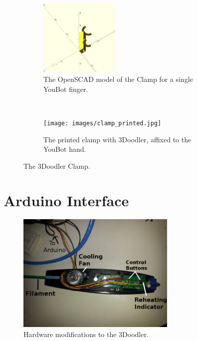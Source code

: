 \documentclass[conference]{acmsiggraph}
\begin{document}
\begin{figure}[t!]
\centering

\begin{subfigure}[t]{1.5in}
\centering
\includegraphics[width=1.5in]{images/clamp.png}
\caption{The OpenSCAD model of the Clamp for a single YouBot finger.}
\label{fig:halfclamp}
\end{subfigure}
~
\begin{subfigure}[t]{1.5in}
\centering
\texttt{[image: images/clamp\_printed.jpg]}
\caption{The printed clamp with 3Doodler, affixed to the YouBot hand.}
\label{fig:printedclamp}
\end{subfigure}
\caption{The 3Doodler Clamp.}
\end{figure}




\section{Arduino Interface}

\begin{figure}[t]
\centering
\includegraphics[width=3.0in]{images/3doodlerCircuitry.jpg}
\caption{Hardware modifications to the 3Doodler.}
\label{fig:circuitry}
\end{figure}
\end{document}
